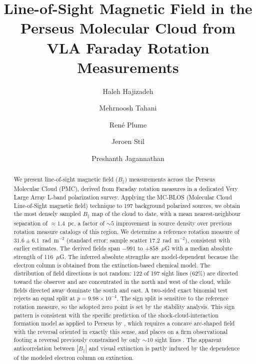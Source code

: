 \documentclass[twocolumn]{aastex701}
\begin{document}
\title{Line-of-Sight Magnetic Field in the Perseus Molecular Cloud from VLA Faraday Rotation Measurements}

\author{Haleh Hajizadeh}

\author{Mehrnoosh Tahani}

\author{Ren\'e Plume}

\author{Jeroen Stil}

\author{Preshanth Jagannathan}

\begin{abstract}
We present line-of-sight magnetic field ($B_\parallel$) measurements across
the Perseus Molecular Cloud (PMC), derived from Faraday rotation measures in
a dedicated Very Large Array L-band polarization survey. Applying the MC-BLOS
(Molecular Cloud Line-of-Sight magnetic field) technique to 197 background
polarized sources, we obtain the most densely sampled $B_\parallel$ map of
the cloud to date, with a mean nearest-neighbour separation of
$\approx 1.4$~pc, a factor of $\sim 5$ improvement in source density
over previous rotation measure catalogs of this region. We determine a
reference rotation measure of $31.6 \pm 6.1$~rad~m$^{-2}$ (standard error;
sample scatter 17.2~rad~m$^{-2}$), consistent with earlier estimates. The
derived fields span $-991$ to $+858$~$\mu$G with a median absolute strength
of 116~$\mu$G. The inferred absolute strengths are model-dependent because
the electron column is obtained from the extinction-based chemical model. The
distribution of field directions is not random: 122 of 197 sight lines (62\%) are directed toward the observer and
are concentrated in the north and west of the cloud, while fields directed
away dominate the south and east. A two-sided exact binomial test rejects an
equal split at $p=9.98\times10^{-4}$. The sign split is sensitive to the
reference rotation measure, so the adopted zero point is set by the stability
analysis. This sign pattern is consistent with the specific
prediction of the shock-cloud-interaction formation model as applied to
Perseus by \citet{tahani2022b}, which requires a concave arc-shaped field
with the reversal oriented in exactly this sense, and places on a firm
observational footing a reversal previously constrained by only $\sim 10$
sight lines \citep{tahani2018}. The apparent anticorrelation between
$|B_\parallel|$ and visual extinction is partly induced by the dependence of
the modeled electron column on extinction.
\end{abstract}
\end{document}
